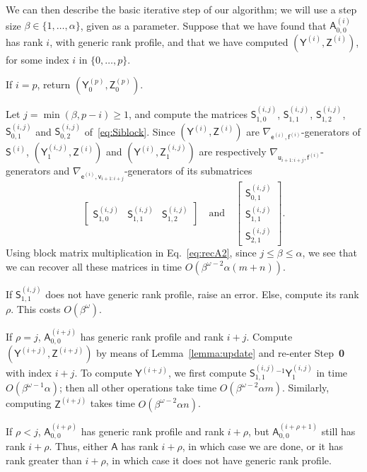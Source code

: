\documentclass{sig-alternate}
\newcommand{\ve}{\ensuremath{\mathsf{e}}}
\newcommand{\vf}{\ensuremath{\mathsf{f}}}
\newcommand{\vu}{\ensuremath{\mathsf{u}}}
\newcommand{\vv}{\ensuremath{\mathsf{v}}}
\newcommand{\mA}{\ensuremath{\mathsf{A}}}
\newcommand{\mS}{\ensuremath{\mathsf{S}}}
\newcommand{\mY}{\ensuremath{\mathsf{Y}}}
\newcommand{\mZ}{\ensuremath{\mathsf{Z}}}
\begin{document}
We can then describe the basic iterative step of our algorithm; we
will use a step size $\beta \in \{1,\dots,\alpha\}$, given as a
parameter.  Suppose that we have found that ${\mA^{(i)}_{0,0}}$ has rank $i$, with
generic rank profile, and that we have computed $(\mY^{(i)},\mZ^{(i)})$, for
some index $i$ in $\{0,\dots,p\}$.

 If $i=p$, return $(\mY^{(p)}_0,\mZ^{(p)}_0)$.

 Let $j=\min(\beta, p-i) \ge 1$, and
compute the matrices $\mS^{(i,j)}_{1,0}$, $\mS^{(i,j)}_{1,1}$,
$\mS^{(i,j)}_{1,2}$, $\mS^{(i,j)}_{0,1}$ and $\mS^{(i,j)}_{0,2}$
of~\eqref{eq:Siblock}. Since $(\mY^{(i)},\mZ^{(i)})$ are
$\nabla_{\ve^{(i)},\vf^{(i)}}$-generators of $\mS^{(i)}$,  $(\mY^{(i,j)}_1,\mZ^{(i)})$ and $(\mY^{(i)},\mZ^{(i,j)}_1)$ are
respectively $\nabla_{\vu_{i+1:i+j}, \vf^{(i)}}$-generators and
$\nabla_{\ve^{(i)},\vv_{i+1:i+j}}$-generators of its submatrices
$$\begin{bmatrix}\mS^{(i,j)}_{1,0} & \mS^{(i,j)}_{1,1} & \mS^{(i,j)}_{1,2}\end{bmatrix} \quad\text{and}\quad
\begin{bmatrix} \mS^{(i,j)}_{0,1}\\ \mS^{(i,j)}_{1,1}\\ \mS^{(i,j)}_{2,1}
\end{bmatrix}.$$ Using block matrix multiplication in
Eq.~\eqref{eq:recA2}, since $j \le \beta \le \alpha$, we see that we can
recover all these matrices in time $O(\beta^{\omega-2} \alpha (m+n))$.

 If $\mS^{(i,j)}_{1,1}$ does not have generic
rank profile, raise an error. Else, compute its rank $\rho$. This
costs $O(\beta^\omega)$.

 If $\rho=j$, $\mA^{(i+j)}_{0,0}$ has generic
rank profile and rank $i+j$. Compute $(\mY^{(i+j)},\mZ^{(i+j)})$ by means
of Lemma~\ref{lemma:update} and re-enter Step~{\bf 0} with index
$i+j$. To compute $\mY^{(i+j)}$, we first compute 
$ \mS^{(i,j)}_{1,1}{}^{-1} \mY^{(i,j)}_1$ in time $O(\beta^{\omega-1} \alpha)$;
then all other operations take time $O(\beta^{\omega-2} \alpha m)$.
Similarly, computing $\mZ^{(i+j)}$ takes time $O(\beta^{\omega-2} \alpha n)$.

 If $\rho < j$,  $\mA^{(i+\rho)}_{0,0}$
has generic rank profile and rank $i+\rho$, but  $\mA^{(i+\rho+1)}_{0,0}$
still has rank $i+\rho$. Thus, either $\mA$ has rank $i+\rho$, in
which case we are done, or it has rank greater than $i+\rho$, in which
case it does not have generic rank profile.
\end{document}
